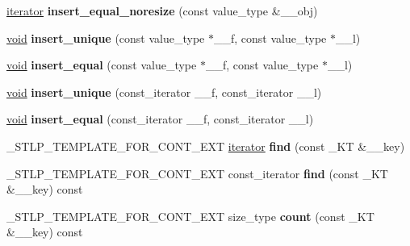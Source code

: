 \begin{DoxyCompactItemize}
\hyperlink{structiterator}{iterator} {\bfseries insert\+\_\+equal\+\_\+noresize} (const value\+\_\+type \&\+\_\+\+\_\+obj)
\item 
\mbox{\label{classhashtable_abc78f4e2494542433a5d48b610012540}} 
\hyperlink{interfacevoid}{void} {\bfseries insert\+\_\+unique} (const value\+\_\+type $\ast$\+\_\+\+\_\+f, const value\+\_\+type $\ast$\+\_\+\+\_\+l)
\item 
\mbox{\label{classhashtable_a906d1973cb8233c69f6bbc6a14447806}} 
\hyperlink{interfacevoid}{void} {\bfseries insert\+\_\+equal} (const value\+\_\+type $\ast$\+\_\+\+\_\+f, const value\+\_\+type $\ast$\+\_\+\+\_\+l)
\item 
\mbox{\label{classhashtable_a7d6ed31a630f60f771aba6e018717604}} 
\hyperlink{interfacevoid}{void} {\bfseries insert\+\_\+unique} (const\+\_\+iterator \+\_\+\+\_\+f, const\+\_\+iterator \+\_\+\+\_\+l)
\item 
\mbox{\label{classhashtable_a36a544f9d96dad053e3aee0dc4d9deda}} 
\hyperlink{interfacevoid}{void} {\bfseries insert\+\_\+equal} (const\+\_\+iterator \+\_\+\+\_\+f, const\+\_\+iterator \+\_\+\+\_\+l)
\item 
\mbox{\label{classhashtable_a9f6c7c05b8895882a3de2764831a0eca}} 
\+\_\+\+S\+T\+L\+P\+\_\+\+T\+E\+M\+P\+L\+A\+T\+E\+\_\+\+F\+O\+R\+\_\+\+C\+O\+N\+T\+\_\+\+E\+XT \hyperlink{structiterator}{iterator} {\bfseries find} (const \+\_\+\+KT \&\+\_\+\+\_\+key)
\item 
\mbox{\label{classhashtable_a0e2a79c8576a96fa82752485844d04e1}} 
\+\_\+\+S\+T\+L\+P\+\_\+\+T\+E\+M\+P\+L\+A\+T\+E\+\_\+\+F\+O\+R\+\_\+\+C\+O\+N\+T\+\_\+\+E\+XT const\+\_\+iterator {\bfseries find} (const \+\_\+\+KT \&\+\_\+\+\_\+key) const
\item 
\mbox{\label{classhashtable_af285e0578bbb1cf071b11e26476e820f}} 
\+\_\+\+S\+T\+L\+P\+\_\+\+T\+E\+M\+P\+L\+A\+T\+E\+\_\+\+F\+O\+R\+\_\+\+C\+O\+N\+T\+\_\+\+E\+XT size\+\_\+type {\bfseries count} (const \+\_\+\+KT \&\+\_\+\+\_\+key) const
\item 
\mbox{\label{classhashtable_ac454537f2e28b45372646c382e98984a}} 

\end{DoxyCompactItemize}
